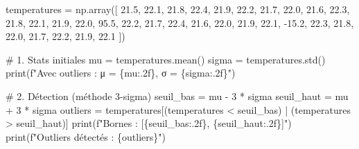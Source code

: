 \documentclass[
  french,
  11pt,
  a4paper,
]{scrbook}
\newenvironment{Shaded}{}{}
\newcommand{\BuiltInTok}[1]{\textcolor[rgb]{0.84,0.23,0.29}{#1}}
\newcommand{\CommentTok}[1]{\textcolor[rgb]{0.42,0.45,0.49}{#1}}
\newcommand{\DecValTok}[1]{\textcolor[rgb]{0.00,0.36,0.77}{#1}}
\newcommand{\FloatTok}[1]{\textcolor[rgb]{0.00,0.36,0.77}{#1}}
\newcommand{\NormalTok}[1]{\textcolor[rgb]{0.14,0.16,0.18}{#1}}
\newcommand{\OperatorTok}[1]{\textcolor[rgb]{0.14,0.16,0.18}{#1}}
\newcommand{\SpecialCharTok}[1]{\textcolor[rgb]{0.00,0.36,0.77}{#1}}
\newcommand{\SpecialStringTok}[1]{\textcolor[rgb]{0.01,0.18,0.38}{#1}}
\begin{document}
\begin{tcolorbox}[enhanced jigsaw, arc=.35mm, bottomrule=.15mm, bottomtitle=1mm, breakable, colback=white, colbacktitle=quarto-callout-tip-color!10!white, colframe=quarto-callout-tip-color-frame, coltitle=black, left=2mm, leftrule=.75mm, opacityback=0, opacitybacktitle=0.6, rightrule=.15mm, title=\textcolor{quarto-callout-tip-color}{\faLightbulb}\hspace{0.5em}{✅ Voir la correction}, titlerule=0mm, toprule=.15mm, toptitle=1mm]

\begin{Shaded}
\begin{Highlighting}[]
\NormalTok{temperatures }\OperatorTok{=}\NormalTok{ np.array([}
    \FloatTok{21.5}\NormalTok{, }\FloatTok{22.1}\NormalTok{, }\FloatTok{21.8}\NormalTok{, }\FloatTok{22.4}\NormalTok{, }\FloatTok{21.9}\NormalTok{, }\FloatTok{22.2}\NormalTok{, }\FloatTok{21.7}\NormalTok{, }\FloatTok{22.0}\NormalTok{, }\FloatTok{21.6}\NormalTok{, }\FloatTok{22.3}\NormalTok{,}
    \FloatTok{21.8}\NormalTok{, }\FloatTok{22.1}\NormalTok{, }\FloatTok{21.9}\NormalTok{, }\FloatTok{22.0}\NormalTok{, }\FloatTok{95.5}\NormalTok{, }\FloatTok{22.2}\NormalTok{, }\FloatTok{21.7}\NormalTok{, }\FloatTok{22.4}\NormalTok{, }\FloatTok{21.6}\NormalTok{, }\FloatTok{22.0}\NormalTok{,}
    \FloatTok{21.9}\NormalTok{, }\FloatTok{22.1}\NormalTok{, }\OperatorTok{{-}}\FloatTok{15.2}\NormalTok{, }\FloatTok{22.3}\NormalTok{, }\FloatTok{21.8}\NormalTok{, }\FloatTok{22.0}\NormalTok{, }\FloatTok{21.7}\NormalTok{, }\FloatTok{22.2}\NormalTok{, }\FloatTok{21.9}\NormalTok{, }\FloatTok{22.1}
\NormalTok{])}

\CommentTok{\# 1. Stats initiales}
\NormalTok{mu }\OperatorTok{=}\NormalTok{ temperatures.mean()}
\NormalTok{sigma }\OperatorTok{=}\NormalTok{ temperatures.std()}
\BuiltInTok{print}\NormalTok{(}\SpecialStringTok{f"Avec outliers : μ = }\SpecialCharTok{\{}\NormalTok{mu}\SpecialCharTok{:.2f\}}\SpecialStringTok{, σ = }\SpecialCharTok{\{}\NormalTok{sigma}\SpecialCharTok{:.2f\}}\SpecialStringTok{"}\NormalTok{)}

\CommentTok{\# 2. Détection (méthode 3{-}sigma)}
\NormalTok{seuil\_bas }\OperatorTok{=}\NormalTok{ mu }\OperatorTok{{-}} \DecValTok{3} \OperatorTok{*}\NormalTok{ sigma}
\NormalTok{seuil\_haut }\OperatorTok{=}\NormalTok{ mu }\OperatorTok{+} \DecValTok{3} \OperatorTok{*}\NormalTok{ sigma}
\NormalTok{outliers }\OperatorTok{=}\NormalTok{ temperatures[(temperatures }\OperatorTok{\textless{}}\NormalTok{ seuil\_bas) }\OperatorTok{|}\NormalTok{ (temperatures }\OperatorTok{\textgreater{}}\NormalTok{ seuil\_haut)]}
\BuiltInTok{print}\NormalTok{(}\SpecialStringTok{f"Bornes : [}\SpecialCharTok{\{}\NormalTok{seuil\_bas}\SpecialCharTok{:.2f\}}\SpecialStringTok{, }\SpecialCharTok{\{}\NormalTok{seuil\_haut}\SpecialCharTok{:.2f\}}\SpecialStringTok{]"}\NormalTok{)}
\BuiltInTok{print}\NormalTok{(}\SpecialStringTok{f"Outliers détectés : }\SpecialCharTok{\{}\NormalTok{outliers}\SpecialCharTok{\}}\SpecialStringTok{"}\NormalTok{)}


\end{Highlighting}
\end{Shaded}
\end{tcolorbox}
\end{document}
